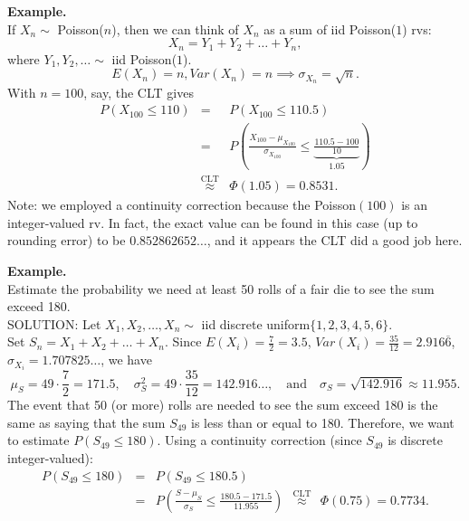 \documentclass[12pt]{article}
\begin{document}
\noindent \textbf{Example.}\\
If $X_n \sim$ Poisson($n$), then we can think of $X_n$ as a sum of iid Poisson($1$) rvs:
$$
X_n = Y_1 + Y_2 + \dots + Y_n,
$$
where $Y_1, Y_2, \dots \sim$ iid Poisson($1$).
$$
E(X_n) = n, Var(X_n) = n \implies \sigma_{X_n} = \sqrt{n}.
$$
With $n=100$, say, the CLT gives
\begin{eqnarray*}
    P(X_{100} \leq 110) &=& P(X_{100} \leq 110.5) \\
    &=& P\left( \frac{X_{100} - \mu_{X_{100}}}{\sigma_{X_{100}}} \leq \underbrace{\frac{110.5 - 100}{10}}_{1.05} \right)\\
    &\stackrel{\text{CLT}}{\approx} & \Phi(1.05) = 0.8531.
\end{eqnarray*}
Note: we employed a continuity correction because the Poisson$(100)$ is an integer-valued rv.
In fact, the exact value can be found in this case (up to rounding error) to be $0.852862652\dots$, and it appears the CLT did a good job here.\\



\newpage


\noindent \textbf{Example.}\\
Estimate the probability we need at least 50 rolls of a fair die to see the sum exceed 180.\\

\noindent SOLUTION:
Let $X_1, X_2, \dots, X_n \sim$ iid discrete uniform$\{1,2,3,4,5,6\}$.\label{discreteuniform4} \\
Set $S_n = X_1 + X_2 + \dots + X_n$. Since $E(X_i)=\frac 72=3.5$, $Var(X_i)=\frac {35}{12}=2.916\overline{6}$, $\sigma_{X_i}=1.707825\dots$,
we have
\begin{equation*}
\mu_S = 49\cdot\frac{7}{2} = 171.5,\quad \sigma_S^2 = 49\cdot\frac{35}{12} = 142.916\dots, \quad \mbox{and}\quad \sigma_S = \sqrt{142.916} \approx 11.955.
\end{equation*}
The event that 50 (or more) rolls are needed to see the sum exceed 180 is the same as saying that
the sum $S_{49}$ is less than or equal to 180.
Therefore, we want to estimate $P(S_{49}\le 180)$. Using a continuity correction (since $S_{49}$ is discrete integer-valued):
\begin{eqnarray*}
    P(S_{49} \leq 180) &=& P(S_{49} \leq 180.5) \\
    &=& P \left( \frac{S - \mu_S}{\sigma_S} \leq \frac{180.5 - 171.5}{11.955} \right) \ \ \stackrel{\text{CLT}}{\approx} \ \  \Phi(0.75) = 0.7734.\\
\end{eqnarray*}
\end{document}
